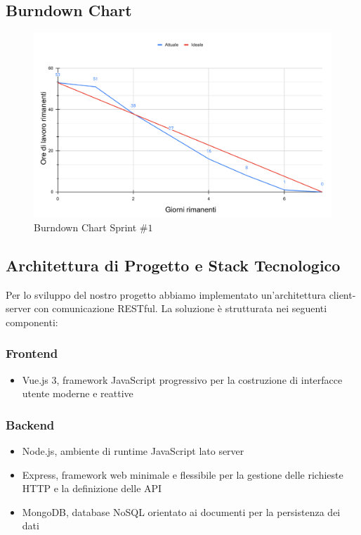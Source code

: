 \subsection{Burndown Chart}

\begin{figure}[!ht]
    \centering
    \includegraphics[trim= 0cm 0cm 0cm 0cm, clip, width=1\linewidth]{Deliverables/third-deliverable/img/BurndownChart.pdf}
    \caption{Burndown Chart Sprint \#$1$}
\end{figure}

\restoregeometry

\subsection{Architettura di Progetto e Stack Tecnologico}
Per lo sviluppo del nostro progetto abbiamo implementato un'architettura client-server con comunicazione RESTful. La soluzione è strutturata nei seguenti componenti:

\subsubsection*{Frontend}
    \begin{itemize}
    \item Vue.js 3, framework JavaScript progressivo per la costruzione di interfacce utente moderne e reattive
    \end{itemize}
\subsubsection*{Backend}
    \begin{itemize}
    \item Node.js, ambiente di runtime JavaScript lato server
    \item Express, framework web minimale e flessibile per la gestione delle richieste HTTP e la definizione delle API
    \item MongoDB, database NoSQL orientato ai documenti per la persistenza dei dati
    \end{itemize}
